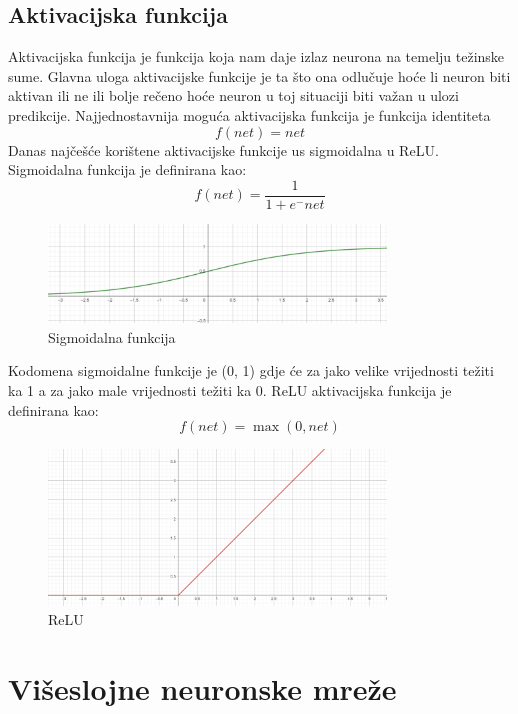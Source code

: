 \subsection{Aktivacijska funkcija}\label{subsec:aktivacijska-funkcija}
Aktivacijska funkcija je funkcija koja nam daje izlaz neurona na temelju težinske sume.
Glavna uloga aktivacijske funkcije je ta što ona odlučuje hoće li neuron biti aktivan ili ne ili bolje rečeno hoće neuron u toj situaciji biti
važan u ulozi predikcije.
Najjednostavnija moguća aktivacijska funkcija je funkcija identiteta
\[ f(\textit{net}) = net \]
Danas najčešće korištene aktivacijske funkcije us sigmoidalna u ReLU.
Sigmoidalna funkcija je definirana kao:
\[ f(\textit{net}) = \frac{1}{1 + e^-net} \]
\FloatBarrier
\begin{figure}[h]
    \centering
    \includegraphics[width=0.8\textwidth]{images/Sigmoid}
    \caption{Sigmoidalna funkcija}
    \label{fig:slika2}
\end{figure}
\FloatBarrier
Kodomena sigmoidalne funkcije je (0, 1) gdje će za jako velike vrijednosti težiti ka 1 a za jako male vrijednosti težiti ka 0.
ReLU aktivacijska funkcija je definirana kao:
\[ f(\textit{net}) = \max(0, \textit{net}) \]
\FloatBarrier
\begin{figure}[h]
    \centering
    \includegraphics[width=0.8\textwidth]{images/ReLU}
    \caption{ReLU}
    \label{fig:slika3}
\end{figure}
\FloatBarrier


\section{Višeslojne neuronske mreže}\label{sec:viseslojne-neuronske-mreze}

